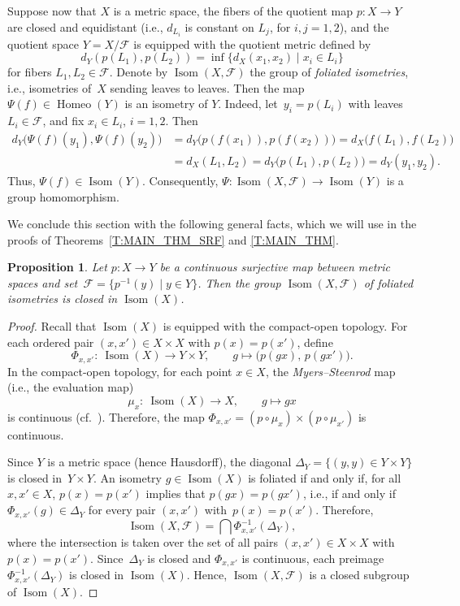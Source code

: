 \documentclass[pdftex]{sigma}
\numberwithin{equation}{section}
\newtheorem{prop}[thm]{Proposition}
\theoremstyle{definition}
\DeclareMathOperator{\Iso}{Isom}
\DeclareMathOperator{\Home}{\mathrm{Homeo}}
\newcommand{\fol}{\mathcal{F}}
\begin{document}
Suppose now that $X$ is a metric space, the fibers of the quotient map $p\colon X\to Y$ are closed and equidistant (i.e., $d_{L_i}$ is constant on $L_j$, for $i, j = 1, 2$), and the quotient space $Y=X/\fol$ is equipped with the quotient metric
defined by
\[
d_Y(p(L_1),p(L_2))=\inf\{d_X(x_1,x_2)\mid x_i\in L_i\}
\]
for fibers $L_1,L_2\in\fol$. Denote by $\Iso(X,\fol)$ the group of \emph{foliated isometries}, i.e., isometries of~$X$ sending leaves to leaves.
Then the map $\Psi(f)\in \Home(Y)$ is an isometry of $Y$. Indeed, let~${y_i=p(L_i)}$ with leaves $L_i\in \fol$, and fix $x_i\in L_i$, $i=1,2$.
Then
\begin{align*}
d_Y\bigl(\Psi(f)(y_1),\Psi(f)(y_2)\bigr)
 &= d_Y\bigl(p(f(x_1)),p(f(x_2))\bigr)= d_X\bigl(f(L_1),f(L_2)\bigr) \\
 &= d_X(L_1,L_2) = d_Y\bigl(p(L_1),p(L_2)\bigr)
 = d_Y(y_1,y_2).
\end{align*}
Thus, $\Psi(f)\in \Iso(Y)$.
Consequently, $\Psi\colon\Iso(X,\fol)\to \Iso(Y)$ is a group homomorphism.



We conclude this section with the following general facts, which we will use in the proofs of Theorems~\ref{T:MAIN_THM_SRF} and \ref{T:MAIN_THM}.




\begin{prop}
\label{P: Iso(Y) closed implies Iso(X,F) closed}
Let $p\colon X\to Y$ be a continuous surjective map between metric spaces
and set~${\fol = \big\{p^{-1}(y)\mid y\in Y\big\}}$. Then the group $\Iso (X,\fol)$ of foliated isometries is closed in $\Iso(X)$.
\end{prop}



\begin{proof}

Recall that $\Iso(X)$ is equipped with the compact-open topology.
For each ordered pair $(x,x')\in X\times X$ with $p(x)=p(x')$, define
\[
\Phi_{x,x'}\colon \ \Iso(X) \to Y\times Y,
\qquad
g \mapsto \bigl(p(gx),\,p(gx')\bigr).
\]
In the compact-open topology, for each point $x\in X$, the \emph{Myers--Steenrod} map (i.e., the evaluation map)
\[
\mu_x\colon \ \Iso(X)\to X, \qquad g\mapsto gx
\]
is continuous (cf.~\cite{GalazGarciaGuijarro2013,GuijarroSantos2018}). Therefore, the map
$
\Phi_{x,x'} = (p\circ \mu_x) \times (p\circ \mu_{x'})
$
is continuous.

Since $Y$ is a metric space (hence Hausdorff), the diagonal
$
\Delta_Y = \{(y,y) \in Y\times Y\}
$
is closed in~${Y\times Y}$.
An isometry $g\in \Iso(X)$ is foliated if and only if, for all $x,x' \in X$,
$p(x)=p(x')$ implies that $p(gx)=p(gx')$,
i.e., if and only if $\Phi_{x,x'}(g)\in \Delta_Y$ for every pair $(x,x')$ with~${p(x)=p(x')}$. Therefore,
\[
\Iso(X,\fol) = \bigcap\Phi_{x,x'}^{-1}(\Delta_Y),
\]
where the intersection is taken over the set of all pairs $(x,x')\in X\times X$ with $p(x)=p(x')$. Since~$\Delta_Y$ is closed and $\Phi_{x,x'}$ is continuous, each preimage $\Phi_{x,x'}^{-1}(\Delta_Y)$ is closed in $\Iso(X)$. Hence, $\Iso(X,\fol)$ is a closed subgroup of $\Iso(X)$.
\end{proof}
\end{document}

